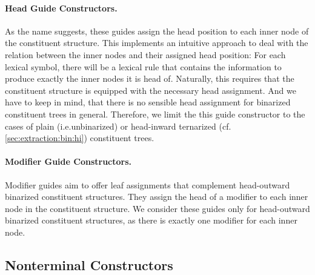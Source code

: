\documentclass[../document.tex]{subfiles}
\begin{document}
    \paragraph{Head Guide Constructors.}
    As the name suggests, these guides assign the head position to each inner node of the constituent structure.
    This implements an intuitive approach to deal with the relation between the inner nodes and their assigned head position: For each lexical symbol, there will be a lexical rule that contains the information to produce exactly the inner nodes it is head of.
    Naturally, this requires that the constituent structure is equipped with the necessary head assignment.
    And we have to keep in mind, that there is no sensible head assignment for binarized constituent trees in general.
    Therefore, we limit the this guide constructor to the cases of plain (i.e.\@ unbinarized) or head-inward ternarized (cf.\@ \cref{sec:extraction:bin:hi}) constituent trees.

    \paragraph{Modifier Guide Constructors.}
    Modifier guides aim to offer leaf assignments that complement head-outward binarized constituent structures.
    They assign the head of a modifier to each inner node in the constituent structure.
    We consider these guides only for head-outward binarized constituent structures, as there is exactly one modifier for each inner node.

    \subsection{Nonterminal Constructors}

    \ifSubfilesClassLoaded{%
        \printindex
    }{}
\end{document}
